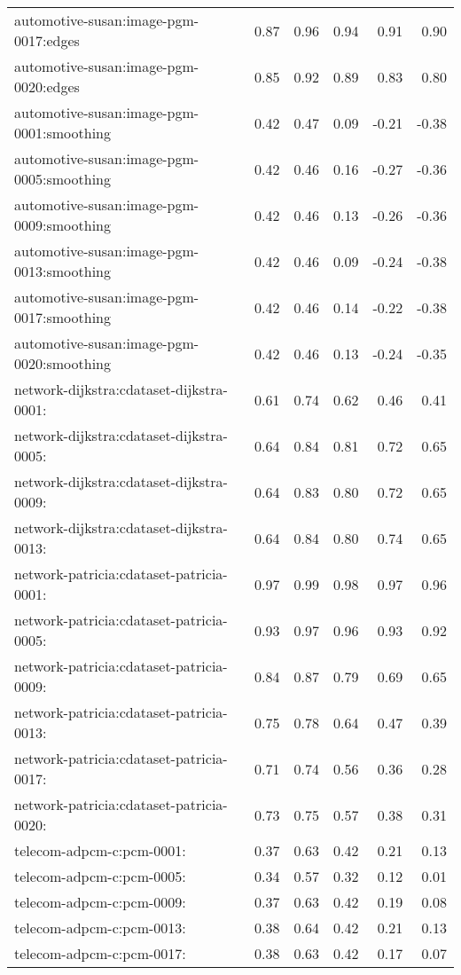 \begin{longtable}{lrrrrr}
automotive-susan:image-pgm-0017:edges & 0.87 & 0.96 & 0.94 & 0.91 & 0.90 \\
automotive-susan:image-pgm-0020:edges & 0.85 & 0.92 & 0.89 & 0.83 & 0.80 \\
automotive-susan:image-pgm-0001:smoothing & 0.42 & 0.47 & 0.09 & -0.21 & -0.38 \\
automotive-susan:image-pgm-0005:smoothing & 0.42 & 0.46 & 0.16 & -0.27 & -0.36 \\
automotive-susan:image-pgm-0009:smoothing & 0.42 & 0.46 & 0.13 & -0.26 & -0.36 \\
automotive-susan:image-pgm-0013:smoothing & 0.42 & 0.46 & 0.09 & -0.24 & -0.38 \\
automotive-susan:image-pgm-0017:smoothing & 0.42 & 0.46 & 0.14 & -0.22 & -0.38 \\
automotive-susan:image-pgm-0020:smoothing & 0.42 & 0.46 & 0.13 & -0.24 & -0.35 \\
network-dijkstra:cdataset-dijkstra-0001: & 0.61 & 0.74 & 0.62 & 0.46 & 0.41 \\
network-dijkstra:cdataset-dijkstra-0005: & 0.64 & 0.84 & 0.81 & 0.72 & 0.65 \\
network-dijkstra:cdataset-dijkstra-0009: & 0.64 & 0.83 & 0.80 & 0.72 & 0.65 \\
network-dijkstra:cdataset-dijkstra-0013: & 0.64 & 0.84 & 0.80 & 0.74 & 0.65 \\
network-patricia:cdataset-patricia-0001: & 0.97 & 0.99 & 0.98 & 0.97 & 0.96 \\
network-patricia:cdataset-patricia-0005: & 0.93 & 0.97 & 0.96 & 0.93 & 0.92 \\
network-patricia:cdataset-patricia-0009: & 0.84 & 0.87 & 0.79 & 0.69 & 0.65 \\
network-patricia:cdataset-patricia-0013: & 0.75 & 0.78 & 0.64 & 0.47 & 0.39 \\
network-patricia:cdataset-patricia-0017: & 0.71 & 0.74 & 0.56 & 0.36 & 0.28 \\
network-patricia:cdataset-patricia-0020: & 0.73 & 0.75 & 0.57 & 0.38 & 0.31 \\
telecom-adpcm-c:pcm-0001: & 0.37 & 0.63 & 0.42 & 0.21 & 0.13 \\
telecom-adpcm-c:pcm-0005: & 0.34 & 0.57 & 0.32 & 0.12 & 0.01 \\
telecom-adpcm-c:pcm-0009: & 0.37 & 0.63 & 0.42 & 0.19 & 0.08 \\
telecom-adpcm-c:pcm-0013: & 0.38 & 0.64 & 0.42 & 0.21 & 0.13 \\
telecom-adpcm-c:pcm-0017: & 0.38 & 0.63 & 0.42 & 0.17 & 0.07 \\

\end{longtable}

